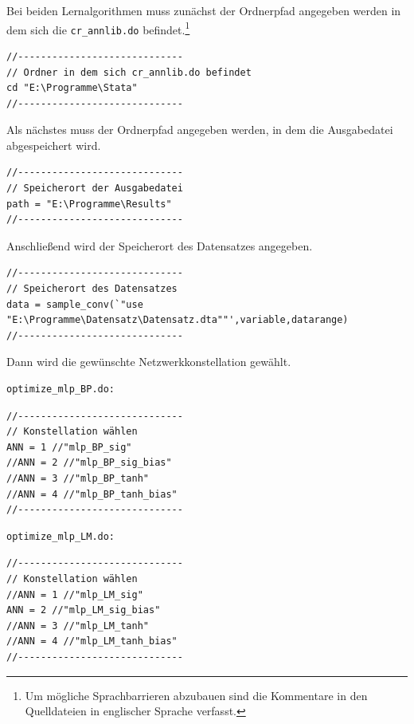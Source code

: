 Bei beiden Lernalgorithmen muss zunächst der Ordnerpfad angegeben werden in dem sich die \verb|cr_annlib.do| befindet.\footnote{Um mögliche Sprachbarrieren abzubauen sind die Kommentare in den Quelldateien in englischer Sprache verfasst.}

{
\begin{lstlisting}[firstnumber=4]
//-----------------------------
// Ordner in dem sich cr_annlib.do befindet
cd "E:\Programme\Stata"
//-----------------------------
\end{lstlisting}
}

\newpage
Als nächstes muss der Ordnerpfad angegeben werden, in dem die Ausgabedatei abgespeichert wird. 


{
\begin{lstlisting}[firstnumber=225]
//-----------------------------
// Speicherort der Ausgabedatei
path = "E:\Programme\Results"
//-----------------------------
\end{lstlisting}
}

Anschließend wird der Speicherort des Datensatzes angegeben.

{
\begin{lstlisting}[firstnumber=257]
//-----------------------------
// Speicherort des Datensatzes
data = sample_conv(`"use "E:\Programme\Datensatz\Datensatz.dta""',variable,datarange)
//-----------------------------
\end{lstlisting}
}

Dann wird die gewünschte Netzwerkkonstellation gewählt.
\begin{Verbatim}
optimize_mlp_BP.do:
\end{Verbatim}
{
\begin{lstlisting}[firstnumber=214]
//-----------------------------
// Konstellation wählen
ANN = 1 //"mlp_BP_sig"
//ANN = 2 //"mlp_BP_sig_bias"
//ANN = 3 //"mlp_BP_tanh"
//ANN = 4 //"mlp_BP_tanh_bias"
//-----------------------------
\end{lstlisting}
}

\begin{Verbatim}
optimize_mlp_LM.do:
\end{Verbatim}
{
\begin{lstlisting}[firstnumber=214]
//-----------------------------
// Konstellation wählen
//ANN = 1 //"mlp_LM_sig"
ANN = 2 //"mlp_LM_sig_bias"
//ANN = 3 //"mlp_LM_tanh"
//ANN = 4 //"mlp_LM_tanh_bias"
//-----------------------------
\end{lstlisting}
}

